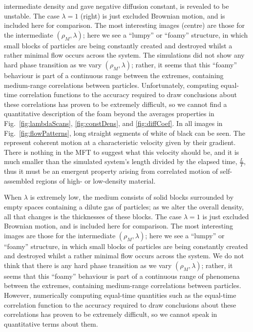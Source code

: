 intermediate density and gave negative diffusion constant, is revealed to be unstable.
The case $\lambda = 1$ (right) is just excluded Brownian motion, and is included here for comparison.
The most interesting images (centre) are those for the intermediate $(\rho_M , \lambda)$; here we see a ``lumpy'' or ``foamy'' structure, in which small blocks
of particles are being constantly created and destroyed whilst a rather minimal flow occurs across the system.
The simulations did not show any hard phase transition as we vary $(\rho_M, \lambda)$; rather, it seems that this ``foamy''
behaviour is part of a continuous range between the extremes, containing medium-range correlations between particles.
Unfortunately, computing equal-time correlation functions to the accuracy required
to draw conclusions about these correlations has proven to be extremely difficult, so we cannot find a quantitative description of the foam beyond the averages properties in Fig.~\ref{fig:lambdaScans}, \ref{fig:constDens},
and \ref{fig:diffCoef}.
In all images in Fig.~\ref{fig:flowPatterns}, long straight segments of white of black can be seen.  The represent coherent motion at a characteristic velocity given by their gradient. There is nothing in the MFT to suggest what this velocity
should be, and it is much smaller than the simulated system's length divided by the elapsed time,  $\frac{L}{T}$, thus it must be an emergent property arising from correlated motion of self-assembled regions of  high- or low-density material.

When $\lambda$ is extremely low, the medium consists of solid blocks surrounded by empty spaces containing a dilute gas of particles; as we alter the overall density,
all that changes is the thicknesses of these blocks. The case $\lambda=1$ is just excluded Brownian motion, and is included here for comparison. The most interesting images are those for the intermediate $(\rho_M , \lambda)$; here
we see a ``lumpy'' or ``foamy'' structure, in which small blocks of particles are being constantly created and destroyed whilst a rather minimal flow occurs across the system.
We do not think that there is any hard phase transition as we vary $(\rho_M , \lambda)$; rather, it seems that this ``foamy'' behaviour is part of a continuous range of phenomena between the extremes, containing medium-range correlations between
particles. However, numerically computing equal-time quantities such as the equal-time correlation function to the accuracy required to draw conclusions about these correlations has proven to be extremely difficult, so we cannot speak in quantitative terms about them.
\fi
\iffalse
